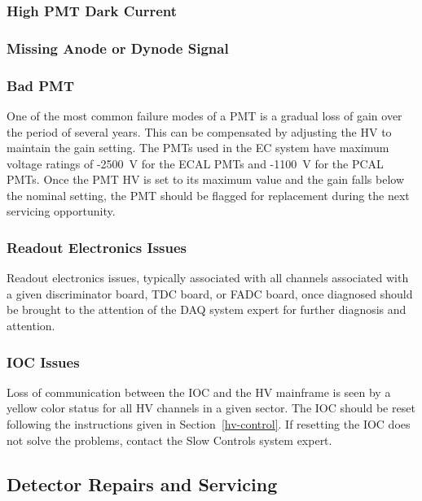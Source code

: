 \documentclass[letterpaper,10pt]{article}
\begin{document}
\subsubsection{High PMT Dark Current}
\label{high-current}

\subsubsection{Missing Anode or Dynode Signal}
\label{missing}


\subsubsection{Bad PMT}
\label{bad-pmt}

One of the most common failure modes of a PMT is a gradual loss of gain over the period of
several years. This can be compensated by adjusting the HV to maintain the gain setting. The
PMTs used in the EC system have maximum voltage ratings of -2500~V for the ECAL PMTs and
-1100~V for the PCAL PMTs.  Once the PMT HV is set to its maximum value
and the gain falls below the nominal setting, the PMT should be flagged for replacement during
the next servicing opportunity.

\subsubsection{Readout Electronics Issues}
\label{readout-issues}

Readout electronics issues, typically associated with all channels associated with a given
discriminator board, TDC board, or FADC board, once diagnosed should be brought to the
attention of the DAQ system expert for further diagnosis and attention.

\subsubsection{IOC Issues}
\label{ioc-issues}

Loss of communication between the IOC and the HV mainframe is seen by a yellow color status for
all HV channels in a given sector. The IOC should be reset following the instructions given in
Section~\ref{hv-control}. If resetting the IOC does not solve the problems, contact the 
Slow Controls system expert.

\subsection{Detector Repairs and Servicing}
\end{document}
